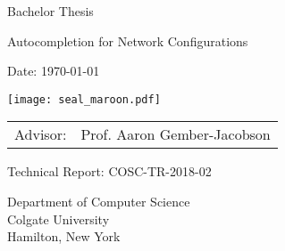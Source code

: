 \documentclass[../thesis.tex]{subfiles}
\begin{document}
\pagestyle{empty}

\begin{titlepage}
	\begin{center}\large

		\vfill
		\vfill
		\vfill
		\vfill

		Bachelor Thesis
		\vspace*{1.35cm}

		{\bfseries{\Large{Autocompletion for Network Configurations\par}}}

		\vspace*{1.35cm}

		\theauthor

		\vspace*{6.0mm}

		Date: \today 

		\vspace*{6.0mm}

        \texttt{[image: seal\_maroon.pdf]}

		\vspace*{6.0mm}
		\begin{tabular}{rl}
			Advisor: & Prof. Aaron Gember-Jacobson\\
		\end{tabular}

		\vspace*{7mm}

        Technical Report: COSC-TR-2018-02


		\vspace*{7mm}
		Department of Computer Science \\
		Colgate University \\
		Hamilton, New York

		\vspace*{12mm}
		\vfill
	\end{center}

\end{titlepage}
\end{document}
